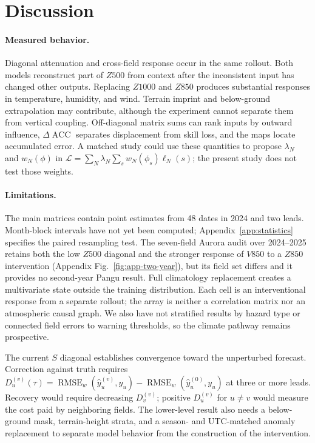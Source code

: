 \documentclass{article}
\newcommand{\rmse}{\operatorname{RMSE}}
\newcommand{\acc}{\operatorname{ACC}}
\begin{document}
\section{Discussion}

\paragraph{Measured behavior.} Diagonal attenuation and cross-field response occur in the same rollout. Both models reconstruct part of $Z500$ from context after the inconsistent input has changed other outputs. Replacing $Z1000$ and $Z850$ produces substantial responses in temperature, humidity, and wind. Terrain imprint and below-ground extrapolation may contribute, although the experiment cannot separate them from vertical coupling. Off-diagonal matrix sums can rank inputs by outward influence, $\Delta\acc$ separates displacement from skill loss, and the maps locate accumulated error. A matched study could use these quantities to propose $\lambda_N$ and $w_N(\phi)$ in $\mathcal L=\sum_N\lambda_N\sum_s w_N(\phi_s)\ell_N(s)$; the present study does not test those weights.

\paragraph{Limitations.} The main matrices contain point estimates from 48 dates in 2024 and two leads. Month-block intervals have not yet been computed; Appendix~\ref{app:statistics} specifies the paired resampling test. The seven-field Aurora audit over 2024--2025 retains both the low $Z500$ diagonal and the stronger response of $V850$ to a $Z850$ intervention (Appendix Fig.~\ref{fig:app-two-year}), but its field set differs and it provides no second-year Pangu result. Full climatology replacement creates a multivariate state outside the training distribution. Each cell is an interventional response from a separate rollout; the array is neither a correlation matrix nor an atmospheric causal graph. We also have not stratified results by hazard type or connected field errors to warning thresholds, so the climate pathway remains prospective.

The current $S$ diagonal establishes convergence toward the unperturbed forecast. Correction against truth requires $D_u^{(v)}(\tau)=\rmse_w(\hat y_u^{(v)},y_u)-\rmse_w(\hat y_u^{(0)},y_u)$ at three or more leads. Recovery would require decreasing $D_v^{(v)}$; positive $D_u^{(v)}$ for $u\ne v$ would measure the cost paid by neighboring fields. The lower-level result also needs a below-ground mask, terrain-height strata, and a season- and UTC-matched anomaly replacement to separate model behavior from the construction of the intervention.
\end{document}
